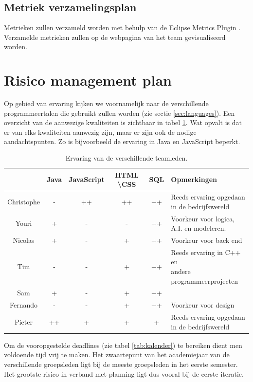 \subsection{Metriek verzamelingsplan}
Metrieken zullen verzameld worden met behulp van de Eclipse Metrics Plugin \cite{EclipseMetricsPlugin}. Verzamelde metrieken zullen op de webpagina van het team gevisualiseerd worden.

\section{Risico management plan} \label{sec:risicoManagementPlan}
Op gebied van ervaring kijken we voornamelijk naar de verschillende programmeertalen die gebruikt zullen worden (zie sectie \ref{sec:languages}). Een overzicht van de aanwezige kwaliteiten is zichtbaar in tabel \ref{tab:skilllevel}. Wat opvalt is dat er van elks kwaliteiten aanwezig zijn, maar er zijn ook de nodige aandachtspunten. Zo is bijvoorbeeld de ervaring in Java en JavaScript beperkt.

\begin{table} [htbp]
	\centering
  	\caption{Ervaring van de verschillende teamleden.}
    \begin{tabular}{c|ccccl}
  		  	& Java 	& JavaScript & HTML \textbackslash CSS 		& SQL 	& Opmerkingen \\
  		  	\hline
  		  	Christophe & -	& ++ 		& ++ 		& ++ & \shortstack{ Reeds ervaring opgedaan \\ in de bedrijfswereld} \\
  		  	Youri & + & - & - & ++ & \shortstack{Voorkeur voor logica, \\ A.I. en modeleren.} \\
  		  	Nicolas & + & - & + & ++ & Voorkeur voor back end \\
  		  	Tim & - & - & + & ++ & \shortstack{Reeds ervaring in C++ en \\ andere programmeerprojecten} \\
  		  	Sam & + & - & + & ++ & \\
  		  	Fernando & - & - & + & ++ & Voorkeur voor design \\
  		  	Pieter & ++ & + & + & + & \shortstack{Reeds ervaring opgedaan \\ in de bedrijfswereld}
    \end{tabular}
  	\label{tab:skilllevel}
\end{table}
Om de vooropgestelde deadlines (zie tabel \ref{tab:kalender}) te bereiken dient men voldoende tijd vrij te maken. Het zwaartepunt van het academiejaar van de verschillende groepsleden ligt bij de meeste groepsleden in het eerste semester. Het grootste risico in verband met planning ligt dus vooral bij de eerste iteratie.
